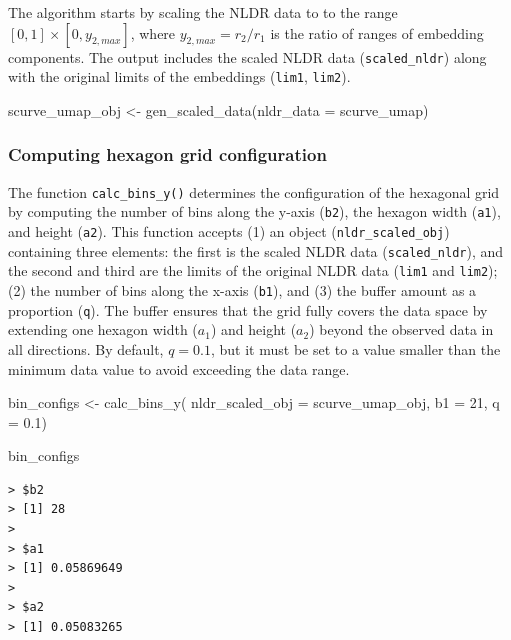 \documentclass[
  11pt,
  a4paper,
]{report}
\newenvironment{Shaded}{\begin{snugshade}}{\end{snugshade}}
\newcommand{\AttributeTok}[1]{\textcolor[rgb]{0.40,0.45,0.13}{#1}}
\newcommand{\DecValTok}[1]{\textcolor[rgb]{0.68,0.00,0.00}{#1}}
\newcommand{\FloatTok}[1]{\textcolor[rgb]{0.68,0.00,0.00}{#1}}
\newcommand{\FunctionTok}[1]{\textcolor[rgb]{0.28,0.35,0.67}{#1}}
\newcommand{\NormalTok}[1]{\textcolor[rgb]{0.00,0.23,0.31}{#1}}
\newcommand{\OtherTok}[1]{\textcolor[rgb]{0.00,0.23,0.31}{#1}}
\begin{document}
The algorithm starts by scaling the NLDR data to to the range
\([0, 1] \times [0, y_{2,max}]\), where \(y_{2,max} = r_2/r_1\) is the
ratio of ranges of embedding components. The output includes the scaled
NLDR data (\texttt{scaled\_nldr}) along with the original limits of the
embeddings (\texttt{lim1}, \texttt{lim2}).

\begin{Shaded}
\begin{Highlighting}[]
\NormalTok{scurve\_umap\_obj }\OtherTok{\textless{}{-}} \FunctionTok{gen\_scaled\_data}\NormalTok{(}\AttributeTok{nldr\_data =}\NormalTok{ scurve\_umap)}
\end{Highlighting}
\end{Shaded}

\subsubsection{Computing hexagon grid
configuration}\label{computing-hexagon-grid-configuration}

The function \texttt{calc\_bins\_y()} determines the configuration of
the hexagonal grid by computing the number of bins along the y-axis
(\texttt{b2}), the hexagon width (\texttt{a1}), and height
(\texttt{a2}). This function accepts (1) an object
(\texttt{nldr\_scaled\_obj}) containing three elements: the first is the
scaled NLDR data (\texttt{scaled\_nldr}), and the second and third are
the limits of the original NLDR data (\texttt{lim1} and \texttt{lim2});
(2) the number of bins along the x-axis (\texttt{b1}), and (3) the
buffer amount as a proportion (\texttt{q}). The buffer ensures that the
grid fully covers the data space by extending one hexagon width
(\(a_1\)) and height (\(a_2\)) beyond the observed data in all
directions. By default, \(q = 0.1\), but it must be set to a value
smaller than the minimum data value to avoid exceeding the data range.

\begin{Shaded}
\begin{Highlighting}[]
\NormalTok{bin\_configs }\OtherTok{\textless{}{-}} \FunctionTok{calc\_bins\_y}\NormalTok{(}
  \AttributeTok{nldr\_scaled\_obj =}\NormalTok{ scurve\_umap\_obj, }
  \AttributeTok{b1 =} \DecValTok{21}\NormalTok{, }
  \AttributeTok{q =} \FloatTok{0.1}\NormalTok{)}

\NormalTok{bin\_configs}
\end{Highlighting}
\end{Shaded}

\begin{verbatim}
> $b2
> [1] 28
> 
> $a1
> [1] 0.05869649
> 
> $a2
> [1] 0.05083265
\end{verbatim}
\end{document}
